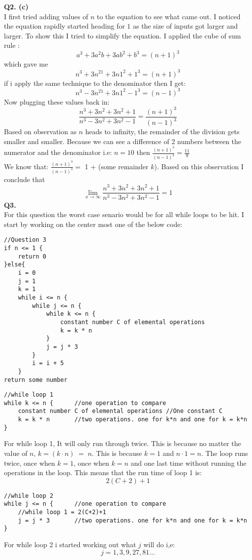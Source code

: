 \documentclass[a4paper,12pt]{article}
\begin{document}
\noindent \textbf{Q2. (c)}\\
I first tried adding values of $n$ to the equation to see what came out. I noticed the equation rapidly started heading for $1$ as the size of inputs got larger and larger. To show this I tried to simplify the equation. I applied the cube of sum rule : 
$$a^3+3a^2b+3ab^2+b^3=(n+1)^3$$ which gave me $$n^3+3n^21+3n1^2+1^3=(n+1)^3$$ if i apply the same technique to the denominator then I get:
$$n^3-3n^21+3n1^2-1^3=(n-1)^3$$
Now plugging these values back in:
$$\frac{n^3+3n^2+3n^2+1}{n^3-3n^2+3n^2-1} = \frac{(n+1)^3}{(n-1)^3}$$
Based on observation as $n$ heads to infinity, the remainder of the division gets smaller and smaller. Because we can see a difference of 2 numbers between the numerator and the denominator i.e: $n=10$ then $\frac{(n+1)^3}{(n-1)^3}=\frac{11}{9}$\\
We know that: $\frac{(n+1)^3}{(n-1)^3}=$ 1 + (some remainder $k$). Based on this observation I conclude that $$\lim\limits_{x \to \infty}\frac{n^3+3n^2+3n^2+1}{n^3-3n^2+3n^2-1} = 1$$
\noindent \textbf{Q3. }\\
For this question the worst case senario would be for all while loops to be hit. I start by working on the center most one of the below code:
\begin{lstlisting}
//Question 3
if n <= 1 {
	return 0
}else{
	i = 0
	j = 1
	k = 1
	while i <= n {
		while j <= n {
			while k <= n {
				constant number C of elemental operations
				k = k * n
			}
			j = j * 3
		}
		i = i + 5
	}
return some number
\end{lstlisting}
\begin{lstlisting}
//while loop 1
while k <= n {		//one operation to compare
	constant number C of elemental operations //One constant C
	k = k * n		//two operations. one for k*n and one for k = k*n
}
\end{lstlisting}
For while loop 1, It will only run through twice. This is because no matter the value of $n$, $k=(k\cdot n)\;=\; n$. This is because $k=1$ and $n\cdot1=n$. The loop runs twice, once when $k=1$, once when $k=n$ and one last time without running the operations in the loop. This means that the run time of loop 1 is:
$$2(C+2)+1$$
\newpage
\begin{lstlisting}
//while loop 2
while j <= n {		//one operation to compare
	//while loop 1 = 2(C+2)+1
	j = j * 3		//two operations. one for k*n and one for k = k*n
}
\end{lstlisting}
For while loop 2 i started working out what $j$ will do i,e:
$$j = 1, 3, 9, 27, 81 \dots$$
\end{document}
